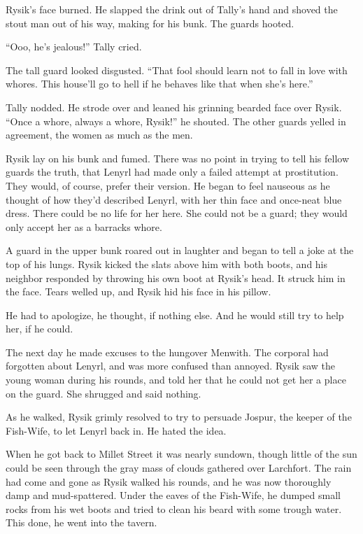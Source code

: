 \documentclass[10pt,b5paper]{article}
\begin{document}
Rysik's face burned. He slapped the drink out of Tally's hand
and shoved the stout man out of his way, making for his bunk.
The guards hooted.

``Ooo, he's jealous!'' Tally cried.

The tall guard looked disgusted. ``That fool should learn not to
fall in love with whores. This house'll go to hell if he behaves
like that when she's here.''

Tally nodded. He strode over and leaned his grinning bearded face
over Rysik. ``Once a whore, always a whore, Rysik!'' he shouted. The
other guards yelled in agreement, the women as much as the men.

Rysik lay on his bunk and fumed. There was no point in trying
to tell his fellow guards the truth, that Lenyrl had made only
a failed attempt at prostitution. They would, of course, prefer
their version. He began to feel nauseous as he thought of how they'd
described Lenyrl, with her thin face and once-neat blue dress. There
could be no life for her here. She could not be a guard; they would
only accept her as a barracks whore.

A guard in the upper bunk roared out in laughter and began to tell
a joke at the top of his lungs. Rysik kicked the slats above him
with both boots, and his neighbor responded by throwing his own
boot at Rysik's head. It struck him in the face. Tears welled up,
and Rysik hid his face in his pillow.

He had to apologize, he thought, if nothing else. And he would
still try to help her, if he could.

\bigskip

The next day he made excuses to the hungover Menwith. The corporal
had forgotten about Lenyrl, and was more confused than annoyed. Rysik
saw the young woman during his rounds, and told her that he could
not get her a place on the guard. She shrugged and said nothing.

As he walked, Rysik grimly resolved to try to persuade Jospur, the
keeper of the Fish-Wife, to let Lenyrl back in. He hated the idea.

When he got back to Millet Street it was nearly sundown, though
little of the sun could be seen through the gray mass of clouds
gathered over Larchfort. The rain had come and gone as Rysik walked
his rounds, and he was now thoroughly damp and mud-spattered.
Under the eaves of the Fish-Wife, he dumped small rocks from his
wet boots and tried to clean his beard with some trough water. This
done, he went into the tavern.
\end{document}

